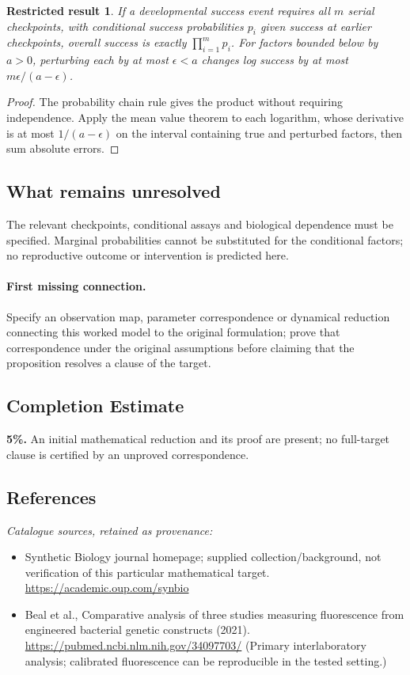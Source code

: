 \documentclass[11pt]{article}
\newtheorem{attemptresult}{Restricted result}[section]
\begin{document}
\begin{attemptresult}
If a developmental success event requires all $m$ serial checkpoints, with conditional success probabilities $p_i$ given success at earlier checkpoints, overall success is exactly $\prod_{i=1}^mp_i$. For factors bounded below by $a>0$, perturbing each by at most $\epsilon<a$ changes log success by at most $m\epsilon/(a-\epsilon)$.
\end{attemptresult}
\begin{proof}
The probability chain rule gives the product without requiring independence. Apply the mean value theorem to each logarithm, whose derivative is at most $1/(a-\epsilon)$ on the interval containing true and perturbed factors, then sum absolute errors.
\end{proof}
\subsection{What remains unresolved}
The relevant checkpoints, conditional assays and biological dependence must be specified. Marginal probabilities cannot be substituted for the conditional factors; no reproductive outcome or intervention is predicted here.
\paragraph{First missing connection.} Specify an observation map, parameter correspondence or dynamical reduction connecting this worked model to the original formulation; prove that correspondence under the original assumptions before claiming that the proposition resolves a clause of the target.
\subsection{Completion Estimate}
\textbf{5\%.} An initial mathematical reduction and its proof are present; no full-target clause is certified by an unproved correspondence.
\subsection{References}
\noindent\emph{Catalogue sources, retained as provenance:}
\begin{itemize}
\item Synthetic Biology journal homepage; supplied collection/background, not verification of this particular mathematical target. \url{https://academic.oup.com/synbio}
\item Beal et al., Comparative analysis of three studies measuring fluorescence from engineered bacterial genetic constructs (2021). \url{https://pubmed.ncbi.nlm.nih.gov/34097703/} (Primary interlaboratory analysis; calibrated fluorescence can be reproducible in the tested setting.)
\end{itemize}
\clearpage
\end{document}
